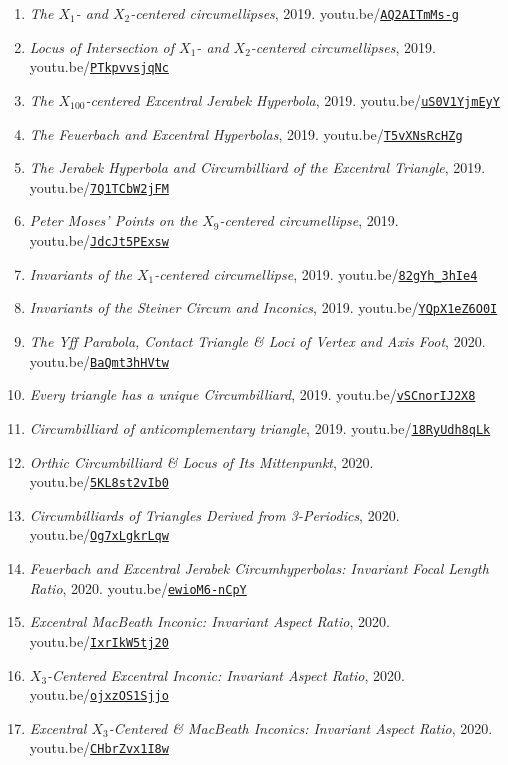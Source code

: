 \documentclass[12pt]{article}
\begin{document}
\begin{enumerate}[resume]
\item \textit{The $X_{1}$- and $X_{2}$-centered circumellipses}, 2019. youtu.be/\href{https://youtu.be/AQ2AITmMs-g}{\nolinkurl{AQ2AITmMs-g}}
\item \textit{Locus of Intersection of $X_{1}$- and $X_{2}$-centered circumellipses}, 2019. youtu.be/\href{https://youtu.be/PTkpvvsjqNc}{\nolinkurl{PTkpvvsjqNc}}
\item \textit{The $X_{100}$-centered Excentral Jerabek Hyperbola}, 2019. youtu.be/\href{https://youtu.be/uS0V1YjmEyY}{\nolinkurl{uS0V1YjmEyY}}
\item \textit{The Feuerbach and Excentral Hyperbolas}, 2019. youtu.be/\href{https://youtu.be/T5vXNsRcHZg}{\nolinkurl{T5vXNsRcHZg}}
\item \textit{The Jerabek Hyperbola and Circumbilliard of the Excentral Triangle}, 2019. youtu.be/\href{https://youtu.be/7Q1TCbW2jFM}{\nolinkurl{7Q1TCbW2jFM}}
\item \textit{Peter Moses' Points on the $X_{9}$-centered circumellipse}, 2019. youtu.be/\href{https://youtu.be/JdcJt5PExsw}{\nolinkurl{JdcJt5PExsw}}
\item \textit{Invariants of the $X_{1}$-centered circumellipse}, 2019. youtu.be/\href{https://youtu.be/82gYh_3hIe4}{\nolinkurl{82gYh\_3hIe4}}
\item \textit{Invariants of the Steiner Circum and Inconics}, 2019. youtu.be/\href{https://youtu.be/YQpX1eZ6O0I}{\nolinkurl{YQpX1eZ6O0I}}
\item \textit{The Yff Parabola, Contact Triangle \& Loci of Vertex and Axis Foot}, 2020. youtu.be/\href{https://youtu.be/BaQmt3hHVtw}{\nolinkurl{BaQmt3hHVtw}}
\item \textit{Every triangle has a unique Circumbilliard}, 2019. youtu.be/\href{https://youtu.be/vSCnorIJ2X8}{\nolinkurl{vSCnorIJ2X8}}
\item \textit{Circumbilliard of anticomplementary triangle}, 2019. youtu.be/\href{https://youtu.be/18RyUdh8qLk}{\nolinkurl{18RyUdh8qLk}}
\item \textit{Orthic Circumbilliard \& Locus of Its Mittenpunkt}, 2020. youtu.be/\href{https://youtu.be/5KL8st2vIb0}{\nolinkurl{5KL8st2vIb0}}
\item \textit{Circumbilliards of Triangles Derived from 3-Periodics}, 2020. youtu.be/\href{https://youtu.be/Og7xLgkrLqw}{\nolinkurl{Og7xLgkrLqw}}
\item \textit{Feuerbach and Excentral Jerabek Circumhyperbolas: Invariant Focal Length Ratio}, 2020. youtu.be/\href{https://youtu.be/ewioM6-nCpY}{\nolinkurl{ewioM6-nCpY}}
\item \textit{Excentral MacBeath Inconic: Invariant Aspect Ratio}, 2020. youtu.be/\href{https://youtu.be/IxrIkW5tj20}{\nolinkurl{IxrIkW5tj20}}
\item \textit{$X_{3}$-Centered Excentral Inconic: Invariant Aspect Ratio}, 2020. youtu.be/\href{https://youtu.be/ojxzOS1Sjjo}{\nolinkurl{ojxzOS1Sjjo}}
\item \textit{Excentral $X_{3}$-Centered \& MacBeath Inconics: Invariant Aspect Ratio}, 2020. youtu.be/\href{https://youtu.be/CHbrZvx1I8w}{\nolinkurl{CHbrZvx1I8w}}
\end{enumerate}
\end{document}
